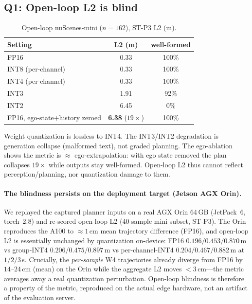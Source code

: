 \documentclass[11pt]{article}
\begin{document}
\subsection{Q1: Open-loop L2 is blind}
\begin{table}[h]\centering
\caption{Open-loop nuScenes-mini ($n{=}162$), ST-P3 L2 (m).}
\begin{tabular}{lcc}
\toprule
Setting & L2 (m) & well-formed \\
\midrule
FP16 & 0.33 & 100\% \\
INT8 (per-channel) & 0.33 & 100\% \\
INT4 (per-channel) & 0.33 & 100\% \\
INT3 & 1.91 & 92\% \\
INT2 & 6.45 & 0\% \\
\midrule
FP16, ego-state+history zeroed & \textbf{6.38} ($19\times$) & 100\% \\
\bottomrule
\end{tabular}
\end{table}
Weight quantization is lossless to INT4. The INT3/INT2 degradation is generation collapse (malformed
text), not graded planning. The ego-ablation shows the metric is $\approx$ ego-extrapolation: with
ego state removed the plan collapses $19\times$ while outputs stay well-formed. Open-loop L2 thus
cannot reflect perception/planning, nor quantization damage to them.

\paragraph{The blindness persists on the deployment target (Jetson AGX Orin).} We replayed the
captured planner inputs on a real AGX Orin 64\,GB (JetPack~6, torch~2.8) and re-scored open-loop L2
(40-sample mini subset, ST-P3). The Orin reproduces the A100 to $\approx 1$\,cm mean trajectory
difference (FP16), and open-loop L2 is essentially unchanged by quantization on-device: FP16
$0.196/0.453/0.870$\,m vs group-INT4 $0.206/0.475/0.897$\,m vs per-channel-INT4 $0.204/0.467/0.882$\,m
at $1/2/3$\,s. Crucially, the \emph{per-sample} W4 trajectories already diverge from FP16 by
$14$--$24$\,cm (mean) on the Orin while the aggregate L2 moves $<3$\,cm---the metric averages away a
real quantization perturbation. Open-loop blindness is therefore a property of the metric, reproduced
on the actual edge hardware, not an artifact of the evaluation server.
\end{document}
